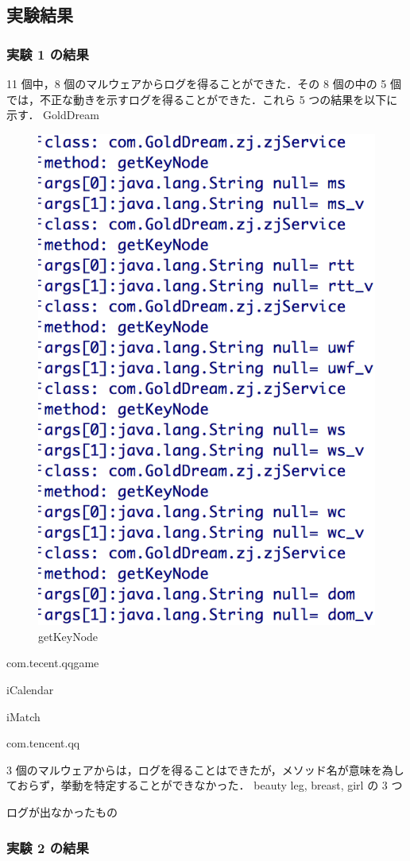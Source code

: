 \subsection{実験結果}
\subsubsection{実験 1 の結果}
11 個中，8 個のマルウェアからログを得ることができた．その 8 個の中の 5 個では，不正な動きを示すログを得ることができた．これら 5 つの結果を以下に示す．
GoldDream
\begin{figure}[t]
\begin{center}
\graphicspath{{./epsfiles/}}
\includegraphics[scale=0.4]{getkeynodezjservice.eps}
\end{center}
\caption{getKeyNode}
\label{zjservicegetkey}
\end{figure}

com.tecent.qqgame

iCalendar

iMatch

com.tencent.qq

3 個のマルウェアからは，ログを得ることはできたが，メソッド名が意味を為しておらず，挙動を特定することができなかった．
beauty leg, breast, girl の 3 つ

ログが出なかったもの

\subsubsection{実験 2 の結果}

